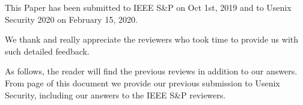 This Paper has been submitted to IEEE S\&P on Oct 1st, 2019 and to Usenix Security 2020 on February 15, 2020.

We thank and really appreciate the reviewers who took time to provide us with
such detailed feedback.

As follows, the reader will find the previous reviews in addition to our answers.
From page \pageref{paper:usenix} of this document we provide our previous submission to Usenix Security, including our answers to the IEEE S\&P reviewers.


